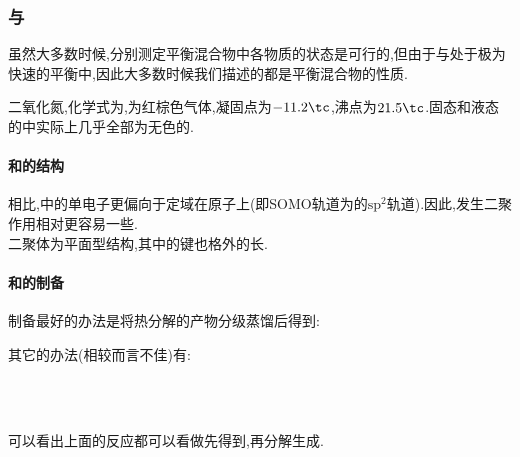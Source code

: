 \documentclass{ctexart}
\begin{document}
\subsubsection{与}
虽然大多数时候,分别测定平衡混合物中各物质的状态是可行的,但由于与处于极为快速的平衡中,因此大多数时候我们描述的都是平衡混合物的性质.
\begin{substance}[\ce{NO2}]
    二氧化氮,化学式为,为红棕色气体,凝固点为$-11.2\tc$,沸点为$21.5\tc$.固态和液态的中实际上几乎全部为无色的.
\end{substance}
\paragraph{和的结构}
相比,中的单电子更偏向于定域在原子上(即SOMO轨道为的$\text{sp}^2$轨道).因此,发生二聚作用相对更容易一些.\\
\indent 二聚体为平面型结构,其中的键也格外的长.
\paragraph{和的制备}
制备最好的办法是将热分解的产物分级蒸馏后得到:
\begin{center}
\end{center}
其它的办法(相较而言不佳)有:
\begin{center}
    \\
    \\
\end{center}
可以看出上面的反应都可以看做先得到,再分解生成.
\end{document}

